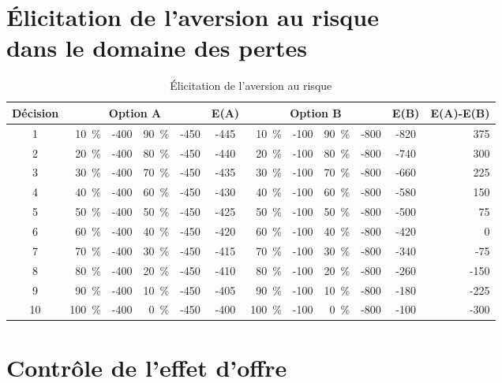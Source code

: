 \begin{Article}
\begin{refsection}[Mouminoux]
\begin{appendices}
\section{Élicitation de l'aversion au risque\\ dans le domaine des pertes}

\label{Annexe:Holt_Laury}

\begin{table}[!h]
    \tabcolsep=3pt
    \centering
\caption{Élicitation de l'aversion au risque}
\label{tab:Holt_Laury}
\begin{tabular}[c]{c|rcrc|c|rcrc|c|r}
\toprule
Décision &\multicolumn{4}{c}{Option A} & E(A)&\multicolumn{4}{c}{Option B} & E(B) & E(A)-E(B)\\
\midrule
1 & 10~\% & -400 & 90~\% & -450 &-445 & 10~\% & -100 & 90~\% & -800 & -820 & 375\\
2 & 20~\% &-400 & 80~\% & -450 & -440 &20~\% & -100 & 80~\% & -800 & -740 & 300\\
3 & 30~\% &-400 & 70~\% & -450 & -435 &30~\% & -100 & 70~\% & -800 & -660 & 225\\
4 & 40~\% &-400 & 60~\% & -450 & -430 & 40~\% & -100 & 60~\% & -800 & -580 & 150\\
5 & 50~\% &-400 & 50~\% & -450 & -425 & 50~\% & -100 & 50~\% & -800 & -500 & 75\\
6 & 60~\% &-400 & 40~\% & -450 & -420 & 60~\% & -100 & 40~\% & -800 & -420 & 0\\
7 & 70~\% &-400 & 30~\% & -450 & -415 & 70~\% & -100 & 30~\% & -800 & -340 & -75\\
8 & 80~\% &-400 & 20~\% & -450 & -410 & 80~\% & -100 & 20~\% & -800 & -260 & -150\\
9 & 90~\% &-400 & 10~\% & -450 & -405 & 90~\% & -100 & 10~\% & -800 & -180 & -225\\
10 & 100~\% &-400 & 0~\% & -450 & -400 & 100~\% & -100 & 0~\% & -800 & -100 & -300\\
\bottomrule
\end{tabular}
\end{table}

\clearpage
\section{Contrôle de l'effet d'offre}
\label{Annexe:supply_effect}



\end{appendices}
\end{refsection}
\end{Article}

